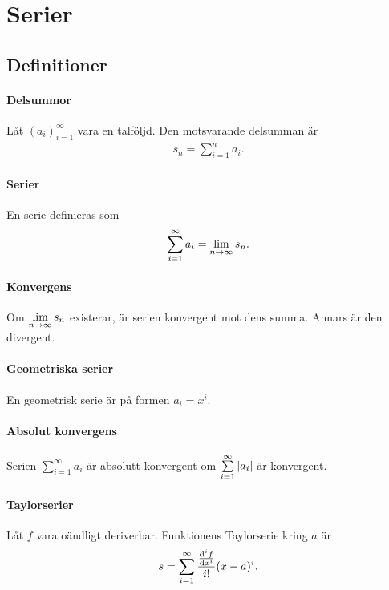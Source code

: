 \section{Serier}

\subsection{Definitioner}

\paragraph{Delsummor}
Låt $\left(a_i\right)_{i = 1}^\infty$ vara en talföljd. Den motsvarande delsumman är
\begin{align*}
	s_n = \sum\limits_{i = 1}^{n}a_i.
\end{align*}

\paragraph{Serier}
En serie definieras som
\begin{align*}
	\sum\limits_{i = 1}^{\infty}a_i = \lim\limits_{n\to \infty}s_n.
\end{align*}

\paragraph{Konvergens}
Om $\lim\limits_{n\to \infty}s_n$ existerar, är serien konvergent mot dens summa. Annars är den divergent.

\paragraph{Geometriska serier}
En geometrisk serie är på formen $a_i = x^i$.

\paragraph{Absolut konvergens}
Serien $\sum\limits_{i = 1}^{\infty}a_i$ är absolutt konvergent om $\sum\limits_{i = 1}^{\infty}\abs{a_i}$ är konvergent.

\paragraph{Taylorserier}
Låt $f$ vara oändligt deriverbar. Funktionens Taylorserie kring $a$ är
\begin{align*}
	s = \sum\limits_{i = 1}^{\infty}\frac{\dv[i]{f}{x}(a)}{i!}(x - a)^i.
\end{align*}

